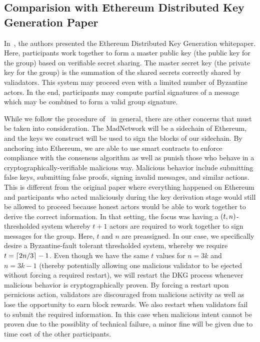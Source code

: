 \subsection{Comparision with Ethereum Distributed Key Generation Paper}
\label{ssec:ethdkg_comparison}

In~\cite{ethdkg}, the authors presented the Ethereum
Distributed Key Generation whitepaper.
Here, participants work together to form a master public key
(the public key for the group)
based on verifiable secret sharing.
The master secret key (the private key for the group)
is the summation of the shared secrets correctly shared by
valiadators.
This system may proceed even with a limited number of Byzantine actors.
In the end, participants may compute partial signatures of a message
which may be combined to form a valid group signature.

While we follow the procedure of~\cite{ethdkg} in general,
there are other concerns that must be taken into consideration.
The MadNetwork will be a sidechain of Ethereum,
and the keys we construct will be used to sign the blocks of our sidechain.
By anchoring into Ethereum, we are able to use smart contracts to enforce
compliance with the consensus algorithm as well as punish
those who behave in a cryptographically-verifiable malicious way.
Malicious behavior include submitting false keys, submitting
false proofs, signing invalid messages, and similar actions.
This is different from the original paper where everything
happened on Ethereum and participants who
acted maliciously during the key derivation stage would still
be allowed to proceed because honest actors would be able to
work together to derive the correct information.
In that setting, the focus was having a $\left( t,n \right)$-thresholded
system whereby $t+1$ actors are required to work together to
sign messages for the group.
Here, $t$ and $n$ are preassigned.
In our case, we specifically desire a Byzantine-fault tolerant
thresholded system, whereby we require $t = \left\lceil 2n/3 \right\rceil-1$.
Even though we have the same $t$ values for $n = 3k$ and $n = 3k-1$
(thereby potentially allowing one malicious validator to be
ejected without forcing a required restart),
we will restart the DKG process whenever malicious behavior
is cryptographically proven.
By forcing a restart upon pernicious action,
validators are discouraged from malicious activity as well
as lose the opportunity to earn block rewards.
We also restart when validators fail to submit the required
information.
In this case when malicious intent cannot be proven due to
the possiblity of technical failure, a minor fine will be
given due to time cost of the other participants.

